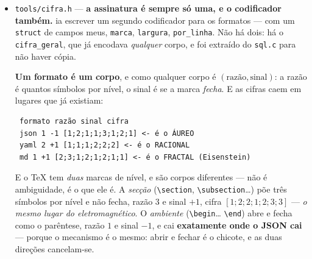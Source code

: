 \documentclass[11pt]{article}
\newcommand{\code}[1]{\texttt{\small #1}}
\theoremstyle{plain}
\theoremstyle{remark}
\begin{document}
\begin{itemize}
\textbf{Enquanto o analisador exigir bytes contíguos, tem de haver um array algures a segurar o
objeto} --- e é daí que vêm o \code{l[8192]} do socket e o \code{cb1}/\code{cb2} do job. Não são
descuidos: são a consequência de se ler com ponteiro.

Ler passa a ser \textbf{pedir o símbolo $k$ a uma fonte}: \code{fn(ctx, k)} devolve o símbolo ou
$-1$ se acabou, e mais nada. Memória ou banco, \emph{e a descida não sabe qual}.

\begin{verbatim}
 o 3.o parâmetro começa no símbolo 35: "20000000"
 e a descida de ponteiro dá o mesmo sítio? sim
\end{verbatim}

\textbf{As duas dão o mesmo sítio} --- a fonte não mudou a lei, só tirou o array de baixo dela. E a
aspa escapada continua a não partir a string. Com isto a mesma descida serve uma linha em memória e
uma linha \emph{em slots}, e o objeto nunca precisa de existir inteiro em lado nenhum.

\item \code{tools/cifra.h} --- \textbf{a assinatura é sempre só uma, e o codificador também.}
ia escrever um segundo codificador para os formatos --- com um \code{struct} de campos meus,
\code{marca}, \code{largura}, \code{por\_linha}. Não há dois: há o \code{cifra\_geral}, que já
encodava \emph{qualquer} corpo, e foi extraído do \code{sql.c} para não haver cópia.

\textbf{Um formato é um corpo}, e como qualquer corpo é $(\text{razão},\text{sinal})$: a razão é
quantos símbolos por nível, o sinal é se a marca \emph{fecha}. E as cifras caem em lugares que já
existiam:

\begin{verbatim}
 formato razão sinal cifra
 json 1 -1 [1;2;1;1;3;1;2;1] <- é o ÁUREO
 yaml 2 +1 [1;1;1;2;2;2] <- é o RACIONAL
 md 1 +1 [2;3;1;2;1;2;1;1] <- é o FRACTAL (Eisenstein)
\end{verbatim}

E o \TeX{} tem \emph{duas} marcas de nível, e são corpos diferentes --- não é ambiguidade, é o
que ele é. A \emph{secção} (\code{\textbackslash section}, \code{\textbackslash subsection}\dots)
põe três símbolos por nível e não fecha, razão $3$ e sinal $+1$, cifra $[1;2;2;1;2;3;3]$ --- \emph{o
mesmo lugar do eletromagnético}. O \emph{ambiente} (\code{\textbackslash begin}\dots
\code{\textbackslash end}) abre e fecha como o parêntese, razão $1$ e sinal $-1$, e cai
\textbf{exatamente onde o JSON cai} --- porque o mecanismo é o mesmo: abrir e fechar é o chicote, e
as duas direções cancelam-se.


\end{itemize}
\end{document}
